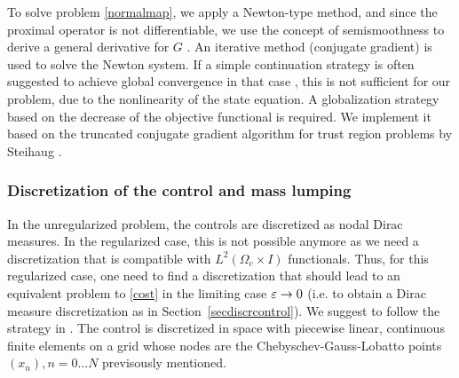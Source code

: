  To solve problem \eqref{normalmap}, we apply a Newton-type method, and since the proximal operator is not differentiable, we use the concept of semismoothness to derive a general derivative for $G$ \cite{ulbrich2002semismooth}. An iterative method (conjugate gradient) is used to solve the Newton system. If a simple continuation strategy is often suggested to achieve global convergence in that case \cite{herzog2012directional}, this is not sufficient for our problem, due to the nonlinearity of the state equation. A globalization strategy based on the decrease of the objective functional is required. We implement it based on the truncated conjugate gradient algorithm for trust region problems by Steihaug \cite{pieperthesis,steihaug1983}.


\subsubsection{Discretization of the control and mass lumping}
In the unregularized problem, the controls are discretized as nodal Dirac measures. In the regularized case, this is not possible anymore as we need a discretization that is compatible with $L^2(\Omega_c \times I)$ functionals. Thus, for this regularized case, one need to find a discretization that should lead to an equivalent problem to \eqref{cost} in the limiting case $\varepsilon \to 0$ (i.e. to obtain a Dirac measure discretization as in Section~\ref{secdiscrcontrol}). We suggest to follow the strategy in \cite{pieper2014}. The control is discretized in space with piecewise linear, continuous finite elements on a grid whose nodes are the Chebyschev-Gauss-Lobatto points $(x_n), n=0 \ldots N$ previsously mentioned.


